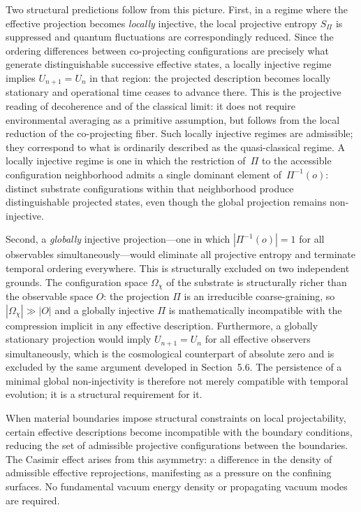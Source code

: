   Two structural predictions follow from this picture.
  First, in a regime where the effective projection becomes \emph{locally} injective,
  the local projective entropy $S_\Pi$ is suppressed and quantum fluctuations are
  correspondingly reduced.
  Since the ordering differences between co-projecting configurations are precisely
  what generate distinguishable successive effective states, a locally injective regime
  implies $U_{n+1} = U_n$ in that region: the projected description becomes locally
  stationary and operational time ceases to advance there.
  This is the projective reading of decoherence and of the classical limit: it does not
  require environmental averaging as a primitive assumption, but follows from the
  local reduction of the co-projecting fiber.
  Such locally injective regimes are admissible; they correspond to what is ordinarily
  described as the quasi-classical regime.
  A locally injective regime is one in which the restriction of~$\Pi$ to the accessible
  configuration neighborhood admits a single dominant element of~$\Pi^{-1}(o)$:
  distinct substrate configurations within that neighborhood produce distinguishable
  projected states, even though the global projection remains non-injective.

  Second, a \emph{globally} injective projection---one in which $|\Pi^{-1}(o)| = 1$
  for all observables simultaneously---would eliminate all projective entropy and
  terminate temporal ordering everywhere.
  This is structurally excluded on two independent grounds.
  The configuration space $\Omega_\chi$ of the substrate is structurally richer than the
  observable space $O$: the projection $\Pi$ is an irreducible coarse-graining, so
  $|\Omega_\chi| \gg |O|$ and a globally injective $\Pi$ is mathematically incompatible
  with the compression implicit in any effective description.
  Furthermore, a globally stationary projection would imply $U_{n+1} = U_n$ for all
  effective observers simultaneously, which is the cosmological counterpart of absolute
  zero and is excluded by the same argument developed in Section~5.6.
  The persistence of a minimal global non-injectivity is therefore not merely compatible
  with temporal evolution; it is a structural requirement for it.

  When material boundaries impose structural constraints on local
  projectability, certain effective descriptions become incompatible with
  the boundary conditions, reducing the set of admissible projective
  configurations between the boundaries.
  The Casimir effect arises from this asymmetry: a difference in the
  density of admissible effective reprojections, manifesting as a pressure
  on the confining surfaces.
  No fundamental vacuum energy density or propagating vacuum modes are
  required.

